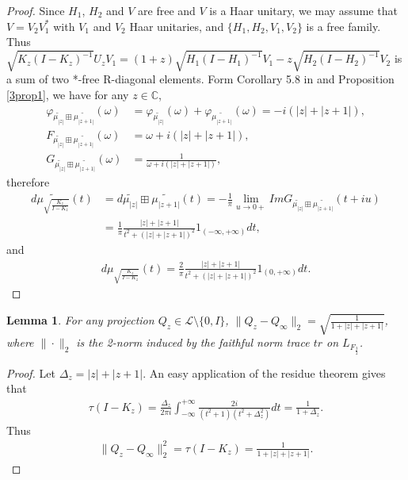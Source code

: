 \documentclass{amsart}
\newcommand{\LLL}{\mathcal L} %
\newcommand{\C}{\mathbb C} %
\newtheorem{lemma}{Lemma}[section]
\begin{document}
\begin{proof}
Since $H_1$, $H_2$ and $V$ are free and $V$ is a Haar unitary, we may assume that $V = V_2V_{1}^*$ with $V_1$ and $V_2$ Haar unitaries, 
and $\{H_1, H_2, V_1, V_2 \}$ is a free family. Thus $\sqrt{K_{z}(I-K_{z})^{-1}}U_{z}V_{1} = (1+z)\sqrt{H_{1}(I-H_{1})^{-1}}V_1- z\sqrt{H_{2}(I-H_{2})^{-1}}V_2$ is 
a sum of two *-free R-diagonal elements.
Form Corollary 5.8 in \cite{HV} and Proposition \ref{3prop1}, we have for any $z \in \C$,
\begin{align*}
\varphi_{\widetilde{\mu_{|z|}}\boxplus \widetilde{\mu_{|z+1|}}}(\omega) &= \varphi_{\widetilde{\mu_{|z|}}}(\omega) + \varphi_{\widetilde{\mu_{|z+1|}}}(\omega) = -i(|z| + |z+1|),\\
F_{\widetilde{\mu_{|z|}}\boxplus \widetilde{\mu_{|z+1|}}}(\omega) &= \omega+ i(|z| + |z+1|),\\
G_{\widetilde{\mu_{|z|}}\boxplus \widetilde{\mu_{|z+1|}}}(\omega) &= \frac{1}{\omega+ i(|z| + |z+1|)},
\end{align*}
therefore
\begin{align*}
d \widetilde{\mu_{\sqrt{\frac{K_z}{I-K_z}}}}(t) &= d\widetilde{\mu_{|z|}}\boxplus \widetilde{\mu_{|z+1|}}(t) =
- \frac{1}{\pi} \lim_{u \rightarrow 0+} Im G_{\widetilde{\mu_{|z|}}\boxplus \widetilde{\mu_{|z+1|}}}(t + iu) \\
&= \frac{1}{\pi}\frac{|z|+|z+1|}{t^2 + (|z|+|z+1|)^2}1_{(-\infty, +\infty)}dt,
\end{align*}
and
\begin{align*}
d \mu_{\sqrt{\frac{K_z}{I-K_z}}}(t) = \frac{2}{\pi}\frac{|z|+|z+1|}{t^2 + (|z|+|z+1|)^2}1_{(0, +\infty)}dt.
\end{align*}
\end{proof}


\begin{lemma}
For any projection $Q_{z} \in \LLL \setminus \{0, I \}$,  $\parallel Q_{z} - Q_{\infty} \parallel_{2} = \sqrt{\frac{1}{1+ |z|+|z+1|}}$, where
$\| \cdot \|_2$ is the 2-norm induced by the faithful norm trace $tr$ on $L_{F_{\frac{3}{2}}}$.
\end{lemma}

\begin{proof}
Let $\Delta_{z} = |z|+|z+1|$. An easy application of the residue theorem gives that 
\begin{align*}
\tau(I- K_z) =\frac{\Delta_z}{2\pi i}\int^{+\infty}_{-\infty} \frac{2i}{(t^2+1)(t^2 + \Delta_{z}^2)}dt =  \frac{1}{1+ \Delta_{z}}.
\end{align*}
Thus
\begin{align*}
\parallel Q_{z} - Q_{\infty} \parallel_{2}^{2} = \tau(I - K_z) =  \frac{1}{1+ |z|+|z+1|}.
\end{align*}
\end{proof}
\end{document}
